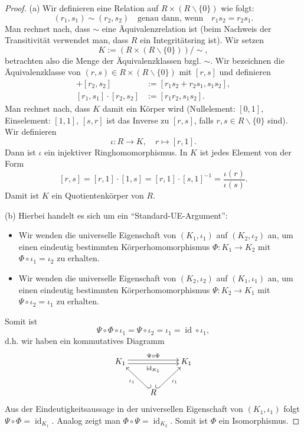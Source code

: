 \documentclass[a4paper, twoside, 11pt, ngerman]{report}
\renewcommand{\setminus}{\smallsetminus}
\DeclareMathOperator{\ident}{id}
\theoremstyle{definistyle}
\theoremstyle{remark}
\begin{document}
\begin{proof}
(a) Wir definieren eine Relation auf $R \times (R \setminus \{0\})$ wie folgt:
\[
(r_1, s_1) \sim (r_2, s_2) \quad \text{genau dann, wenn} \quad r_1 s_2 = r_2 s_1.
\]
Man rechnet nach, dass $\sim$ eine Äquivalenzrelation ist (beim Nachweis der Transitivität
verwendet man, dass $R$ ein Integritätsring ist). Wir setzen 
\[K := (R \times (R \setminus \{0\}))/\sim,\]
betrachten also die Menge der Äquivalenzklassen bzgl. $\sim$.
Wir bezeichnen die Äquivalenzklasse von $(r, s) \in R \times (R \setminus \{0\})$ mit $[r, s]$
und definieren 
\begin{align*}
[r_1, s_1] + [r_2, s_2] &:= [r_1 s_2 + r_2 s_1, s_1 s_2],\\
[r_1, s_1] \cdot [r_2, s_2] &:= [r_1 r_2, s_1 s_2].
\end{align*}
Man rechnet nach, dass $K$ damit ein Körper wird (Nullelement: $[0,1]$, Einselement: $[1,1]$, $[s,r]$ ist das Inverse zu $[r,s]$, falls $r,s\in R\setminus\{0\}$ sind). Wir definieren 
\[\iota \colon R \to K, \quad r \mapsto [r,1].\]
Dann ist $\iota$ ein injektiver Ringhomomorphismus.
In $K$ ist jedes Element von der Form
\[
[r, s] = [r,1] \cdot [1,s] = [r,1] \cdot [s,1]^{-1} = \frac{\iota(r)}{\iota(s)}.
\]
Damit ist $K$ ein Quotientenkörper von $R$.

(b) Hierbei handelt es sich um ein "`Standard-UE-Argument"':
\begin{itemize}
\item Wir wenden die universelle Eigenschaft von $(K_1, \iota_1)$ auf $(K_2, \iota_2)$ an, um einen eindeutig bestimmten Körperhomomorphismus $\Phi \colon K_1 \to K_2$ mit $\Phi \circ \iota_1 = \iota_2$ zu erhalten.
\item Wir wenden die universelle Eigenschaft von $(K_2, \iota_2)$ auf $(K_1, \iota_1)$ an, um einen eindeutig bestimmten Körperhomomorphismus $\Psi \colon K_2 \to K_1$ mit $\Psi \circ \iota_2 = \iota_1$ zu erhalten.
\end{itemize}
Somit ist
\[
\Psi\circ\Phi\circ\iota_1=\Psi\circ\iota_2=\iota_1=\ident\circ\iota_1,
\]
d.h. wir haben ein kommutatives Diagramm
\[
\begin{xy}
\xymatrix{
K_1 \ar@<0.5ex>[rr]^{\Psi\circ\Phi} \ar@<-0.5ex>[rr]_{\operatorname{id}_{K_1}} & & K_1 \\
& R \ar@{_{(}->}[ul]^{\iota_1} \ar@{^{(}->}[ur]_{\iota_1}
}
\end{xy}
\]
Aus der Eindeutigkeitsaussage in der universellen Eigenschaft von $(K_1,\iota_1)$ folgt $\Psi\circ\Phi=\ident_{K_1}$. Analog zeigt man $\Phi\circ\Psi=\ident_{K_2}$. Somit ist $\Phi$ ein Isomorphismus.
\end{proof}
\end{document}
